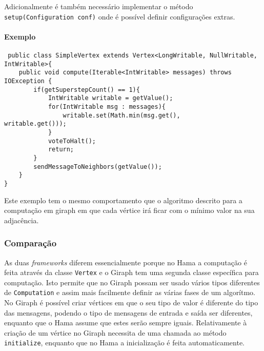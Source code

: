 Adicionalmente é também necessário implementar o método \texttt{setup(Configuration conf)} onde é possível definir configurações extras.

\paragraph{Exemplo}
\begin{verbatim}
 public class SimpleVertex extends Vertex<LongWritable, NullWritable, 
IntWritable>{
	public void compute(Iterable<IntWritable> messages) throws IOException {
		if(getSuperstepCount() == 1){
			IntWritable writable = getValue();
			for(IntWritable msg : messages){
				writable.set(Math.min(msg.get(), 
writable.get()));
			}
			voteToHalt();
			return;
		}
		sendMessageToNeighbors(getValue());
	}
}
\end{verbatim}

Este exemplo tem o mesmo comportamento que o algoritmo descrito para a 
computação em giraph em que cada vértice irá ficar com o mínimo valor na sua 
adjacência.

\subsubsection*{Comparação}


As duas \textit{frameworks} diferem essencialmente porque no Hama a computação é feita através da classe \texttt{Vertex} e o Giraph tem uma segunda classe específica para computação. Isto permite que no Giraph possam ser usado vários tipos diferentes de \texttt{Computation} e assim mais facilmente definir as várias fases de um algorítmo.
No Giraph é possível criar vértices em que o seu tipo de valor é diferente do tipo das mensagens, podendo o tipo de mensagens de entrada e saída ser diferentes, enquanto que o Hama assume que estes serão sempre iguais. Relativamente à criação de um vértice no Giraph necessita de uma chamada ao método \texttt{initialize}, enquanto que no Hama a inicialização é feita automaticamente.